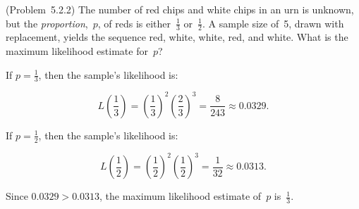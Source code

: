 \begin{problem}
  (\textnormal{Problem~5.2.2}) The number of red chips and white chips in an urn is unknown, but the \textit{proportion},~$p$, of reds is either~$\frac{1}{3}$ or~$\frac{1}{2}$. A sample size of~5, drawn with replacement, yields the sequence red, white, white, red, and white.  What is the maximum likelihood estimate for~$p$?
\end{problem}

If ${p=\frac{1}{3}}$, then the sample's likelihood is:

\begin{equation}\label{eq:P01:1s3Likelihood}
  L\left(\frac{1}{3}\right) = \left(\frac{1}{3}\right)^2 \left( \frac{2}{3} \right)^{3} = \frac{8}{243} \approx 0.0329\text{.}
\end{equation}

\noindent
If ${p=\frac{1}{2}}$, then the sample's likelihood is:

\begin{equation}\label{eq:P01:1s2Likelihood}
  L\left(\frac{1}{2}\right) = \left(\frac{1}{2}\right)^2 \left( \frac{1}{2} \right)^{3} = \frac{1}{32} \approx 0.0313\text{.}
\end{equation}

\noindent
Since ${0.0329 > 0.0313}$, the maximum likelihood estimate of~$p$ is~$\boxed{\frac{1}{3}}$.
